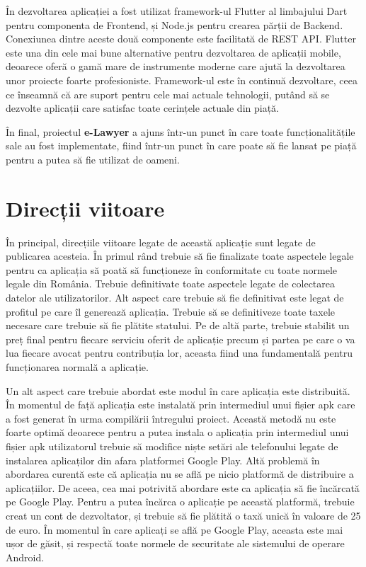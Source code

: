 \documentclass[12pt,a4paper]{report}
\theoremstyle{definition}
\theoremstyle{remark}
\begin{document}
În dezvoltarea aplicației a fost utilizat framework-ul Flutter al limbajului Dart pentru componenta de Frontend, și Node.js pentru crearea părții de Backend. Conexiunea dintre aceste două componente este facilitată de REST API. Flutter este una din cele mai bune alternative pentru dezvoltarea de aplicații mobile, deoarece oferă o gamă mare de instrumente moderne care ajută la dezvoltarea unor proiecte foarte profesioniste. Framework-ul este în continuă dezvoltare, ceea ce înseamnă că are suport pentru cele mai actuale tehnologii, putând să se dezvolte aplicații care satisfac toate cerințele actuale din piață.

În final, proiectul \textbf{e-Lawyer} a ajuns într-un punct în care toate funcționalitățile sale au fost implementate, fiind într-un punct în care poate să fie lansat pe piață pentru a putea să fie utilizat de oameni.  

\section{Direcții viitoare}
În principal, direcțiile viitoare legate de această aplicație sunt legate de publicarea acesteia. În primul rând trebuie să fie finalizate toate aspectele legale pentru ca aplicația să poată să funcționeze în conformitate cu toate normele legale din România. Trebuie definitivate toate aspectele legate de colectarea datelor ale utilizatorilor. Alt aspect care trebuie să fie definitivat este legat de profitul pe care îl generează aplicația. Trebuie să se definitiveze toate taxele necesare care trebuie să fie plătite statului. Pe de altă parte, trebuie stabilit un preț final pentru fiecare serviciu oferit de aplicație precum și partea pe care o va lua fiecare avocat pentru contribuția lor, aceasta fiind una fundamentală pentru funcționarea normală a aplicație.

Un alt aspect care trebuie abordat este modul în care aplicația este distribuită. În momentul de față aplicația este instalată prin intermediul unui fișier apk care a fost generat în urma compilării întregului proiect. Această metodă nu este foarte optimă deoarece pentru a putea instala o aplicația prin intermediul unui fișier apk utilizatorul trebuie să modifice niște setări ale telefonului legate de instalarea aplicaților din afara platformei Google Play. Altă problemă în abordarea curentă este că aplicația nu se află pe nicio platformă de distribuire a aplicațiilor. De aceea, cea mai potrivită abordare este ca aplicația să fie încărcată pe Google Play. Pentru a putea încărca o aplicație pe această platformă, trebuie creat un cont de dezvoltator, și trebuie să fie plătită o taxă unică în valoare de 25 de euro. În momentul în care aplicați se află pe Google Play, aceasta este mai ușor de găsit, și respectă toate normele de securitate ale sistemului de operare Android.
\end{document}
